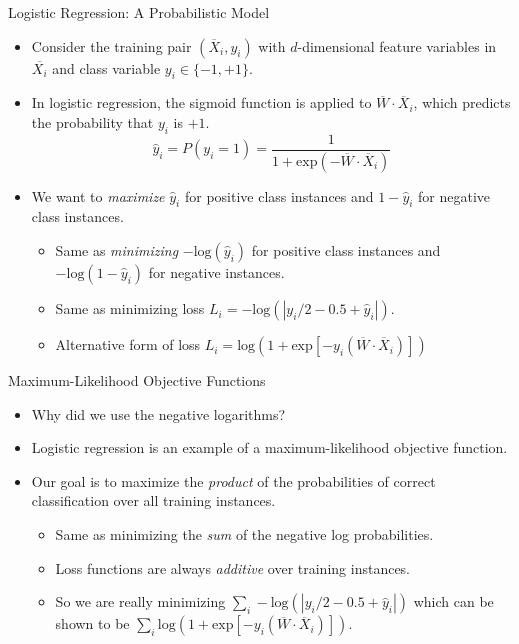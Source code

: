 \begin{frame}{Logistic Regression: A Probabilistic Model}
\begin{itemize}
\item Consider the training pair $(\overline{X}_i, y_i)$ with
$d$-dimensional feature variables in $\overline{X_i}$ and class
variable $y_i \in \{ -1, +1 \}$.
\item In logistic regression, the sigmoid function is applied to
$\overline{W} \cdot \overline{X}_i$, which predicts  the probability
that  $y_i$ is $+1$.
\begin{equation*}
\hat{y}_i= P(y_i=1)= \frac{1}{1 +\mbox{exp}(-\overline{W} \cdot
\overline{X}_i)}
\end{equation*}
\item  We want to {\em maximize} $\hat{y}_i$ for positive class instances
and $1- \hat{y}_i$ for negative class instances.
\begin{itemize}
\item Same as {\em minimizing} $-\mbox{log}(\hat{y}_i)$ for positive
class instances and $-\mbox{log}(1- \hat{y}_i)$ for negative
instances.
\item Same as minimizing loss $L_i=-\mbox{log}(|y_i/2 -0.5 + \hat{y}_i |)$.
\item Alternative form of loss $L_i= \mbox{log}(1+ \mbox{exp}[-y_i( \overline{W} \cdot \overline{X}_i)])$
\end{itemize}
\end{itemize}
\end{frame}


\begin{frame}{Maximum-Likelihood Objective Functions}
\begin{itemize}
\item Why did we use the negative logarithms?
\item Logistic regression is an example of a maximum-likelihood
objective function.
\item Our goal is to maximize the {\em product} of the probabilities of
 correct classification over all training instances.
 \begin{itemize}
 \item Same as minimizing the {\em sum} of the negative log probabilities.
 \item Loss functions are always {\em additive} over training
 instances.
 \item So we are really minimizing $\sum_i -\mbox{log}(|y_i/2 -0.5 + \hat{y}_i
 |)$ which can be shown to be $\sum_i \mbox{log}(1+ \mbox{exp}[-y_i( \overline{W} \cdot \overline{X}_i)])$.
 \end{itemize}
\end{itemize}
\end{frame}


